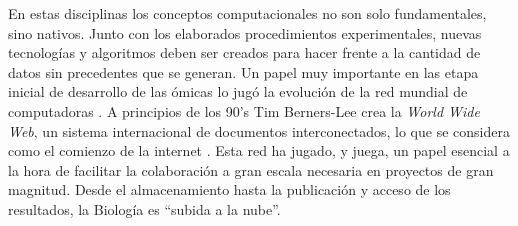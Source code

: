 En estas disciplinas los conceptos computacionales no son solo fundamentales, sino nativos.
Junto con los elaborados procedimientos experimentales, nuevas tecnologías y algoritmos deben ser creados para hacer frente a la cantidad de datos sin precedentes que se generan.
Un papel muy importante en las etapa inicial de desarrollo de las ómicas lo jugó la evolución de la red mundial de computadoras \cite{gauthierBriefHistoryBioinformatics2019}.
A principios de los 90's Tim Berners-Lee crea la \textit{World Wide Web}, un sistema internacional de documentos interconectados, lo que se considera como el comienzo de la internet \cite{web:WWW}.
Esta red ha jugado, y juega, un papel esencial a la hora de facilitar la colaboración a gran escala necesaria en proyectos de gran magnitud.
Desde el almacenamiento hasta la publicación y acceso de los resultados, la Biología es ``subida a la nube''.

